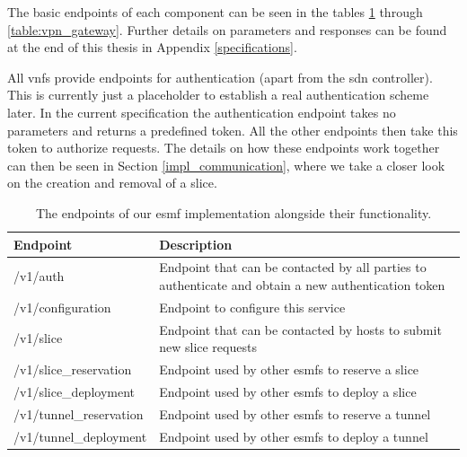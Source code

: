 The basic endpoints of each component can be seen in the tables \ref{table:esmf} through \ref{table:vpn_gateway}. Further details on parameters and responses can be found at the end of this thesis in Appendix \ref{specifications}.

All \acrshort{vnf}s provide endpoints for authentication (apart from the \acrshort{sdn} controller). This is currently just a placeholder to establish a real authentication scheme later. In the current specification the authentication endpoint takes no parameters and returns a predefined token. All the other endpoints then take this token to authorize requests. The details on how these endpoints work together can then be seen in Section \ref{impl_communication}, where we take a closer look on the creation and removal of a slice.

\begin{table}[htp]
    \begin{tabularx}{\textwidth}{ |l|X| }
        \hline
        \textbf{Endpoint}       & \textbf{Description}                                                                                \\
        \hline
        /v1/auth                & Endpoint that can be contacted by all parties to authenticate and obtain a new authentication token \\
        /v1/configuration       & Endpoint to configure this service                                                                  \\
        \hline
        /v1/slice               & Endpoint that can be contacted by hosts to submit new slice requests                                \\
        \hline
        /v1/slice\_reservation  & Endpoint used by other \acrshort{esmf}s to reserve a slice                                          \\
        /v1/slice\_deployment   & Endpoint used by other \acrshort{esmf}s to deploy a slice                                           \\
        /v1/tunnel\_reservation & Endpoint used by other \acrshort{esmf}s to reserve a tunnel                                         \\
        /v1/tunnel\_deployment  & Endpoint used by other \acrshort{esmf}s to deploy a tunnel                                          \\
        \hline
    \end{tabularx}
    \caption[\acrshort{esmf} endpoints]{The endpoints of our \acrshort{esmf} implementation alongside their functionality.}
    \label{table:esmf}
\end{table}

